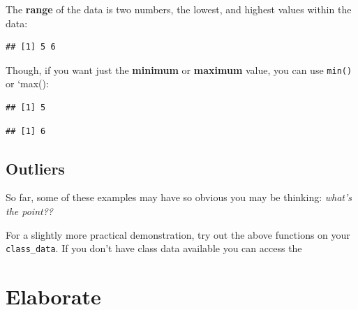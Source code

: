 \documentclass[
]{book}
\newenvironment{Shaded}{\begin{snugshade}}{\end{snugshade}}
\newcommand{\FunctionTok}[1]{\textcolor[rgb]{0.13,0.29,0.53}{\textbf{#1}}}
\newcommand{\NormalTok}[1]{#1}
\newcommand{\SpecialCharTok}[1]{\textcolor[rgb]{0.81,0.36,0.00}{\textbf{#1}}}
\begin{document}
The \textbf{range} of the data is two numbers, the lowest, and highest values within the data:

\begin{Shaded}
\end{Shaded}

\begin{verbatim}
## [1] 5 6
\end{verbatim}

Though, if you want just the \textbf{minimum} or \textbf{maximum} value, you can use \texttt{min()} or `max():

\begin{Shaded}
\end{Shaded}

\begin{verbatim}
## [1] 5
\end{verbatim}

\begin{Shaded}
\end{Shaded}

\begin{verbatim}
## [1] 6
\end{verbatim}

\hypertarget{outliers}{%
\subsection{Outliers}\label{outliers}}

So far, some of these examples may have so obvious you may be thinking: \emph{what's the point??}

For a slightly more practical demonstration, try out the above functions on your \texttt{class\_data}. If you don't have class data available you can access the

\hypertarget{elaborate}{%
\section{Elaborate}\label{elaborate}}
\end{document}
